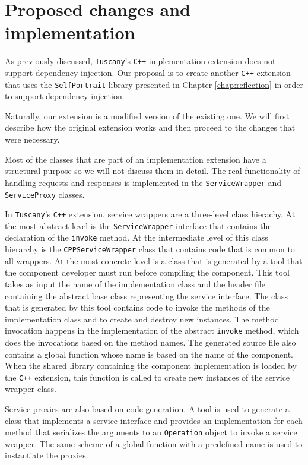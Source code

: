 \section{Proposed changes and implementation}

As previously discussed, \texttt{Tuscany}'s \texttt{C++} implementation extension does not support dependency injection. Our proposal is to
create another \texttt{C++} extension that uses the \texttt{SelfPortrait} library presented in Chapter \ref{chap:reflection} in order
to support dependency injection. 

Naturally, our extension is a modified version of the existing one. We will first describe how the original extension works
and then proceed to the changes that were necessary.
 
Most of the classes that are part of an implementation extension have a structural purpose so we will not discuss them in
detail. The real functionality of handling requests and responses is implemented in the \texttt{ServiceWrapper} and 
\texttt{ServiceProxy} classes. 

In \texttt{Tuscany}'s \texttt{C++} extension, service wrappers are a three-level class hierachy. At the most abstract level is the
\texttt{ServiceWrapper} interface that contains the declaration of the \texttt{invoke} method. At the intermediate level of
this class hierarchy is the \texttt{CPPServiceWrapper} class that contains code that is common to all wrappers.
At the most concrete level is a class that is generated by a tool that the component developer must run before
compiling the component. This tool takes as input the name of the implementation class and the header file containing
the abstract base class representing the service interface. The class that is generated by this tool contains code
to invoke the methods of the implementation class and to create and destroy new instances. The method invocation
happens in the implementation of the abstract \texttt{invoke} method, which does the invocations based on the method names.
The generated source file also contains a global function whose name is based on the name of the component. When
the shared library containing the component implementation is loaded by the \texttt{C++} extension, this function is called
to create new instances of the service wrapper class.

Service proxies are also based on code generation. A tool is used to generate a class that implements a service interface
and provides an implementation for each method that serializes the arguments to an \texttt{Operation} object to invoke a service
wrapper. The same scheme of a global function with a predefined name is used to instantiate the proxies.

